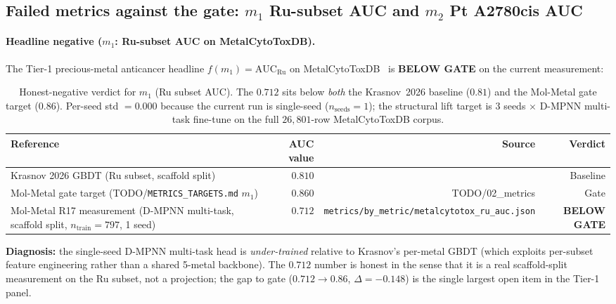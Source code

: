 \subsection{Failed metrics against the gate: $m_1$ Ru-subset AUC and $m_2$ Pt A2780cis AUC}
\label{sec:honest-negative:failed-metrics}

\paragraph{Headline negative ($m_1$: Ru-subset AUC on MetalCytoToxDB).}
The Tier-1 precious-metal anticancer headline
$f(m_1)\!=\!\mathrm{AUC}_{\mathrm{Ru}}$ on
MetalCytoToxDB~\cite{krasnov2026metalcytotoxdb} is \textbf{BELOW
GATE} on the current measurement:

\begin{table}[ht]
\centering
\small
\setlength{\tabcolsep}{4pt}
\begin{tabular}{lrrr}
\toprule
\textbf{Reference} & \textbf{AUC value} & \textbf{Source} & \textbf{Verdict} \\
\midrule
Krasnov 2026 GBDT (Ru subset, scaffold split) & $0.810$ \CITEDONLY{} &
\cite{krasnov2026metalcytotoxdb} & Baseline \\
Mol-Metal gate target (TODO/\texttt{METRICS\_TARGETS.md} $m_1$) & $0.860$ & TODO/02\_metrics & Gate \\
Mol-Metal R17 measurement (D-MPNN multi-task, scaffold split,
$n_{\mathrm{train}}{=}797$, 1 seed) & $0.712$ \MEASURED{} &
\texttt{metrics/by\_metric/metalcytotox\_ru\_auc.json} & \textbf{BELOW GATE} \\
\bottomrule
\end{tabular}
\caption{Honest-negative verdict for $m_1$ (Ru subset AUC).
The \MEASURED{} $0.712$ sits below \emph{both} the Krasnov~2026
baseline ($0.81$) and the Mol-Metal gate target ($0.86$).  Per-seed
std $= 0.000$ because the current run is single-seed ($n_{\mathrm{seeds}}{=}1$);
the structural lift target is $3$ seeds $\times$ D-MPNN multi-task
fine-tune on the full $26{,}801$-row MetalCytoToxDB corpus.}
\label{tab:honest-m1}
\end{table}

\textbf{Diagnosis:} the single-seed D-MPNN multi-task head is
\emph{under-trained} relative to Krasnov's per-metal GBDT (which
exploits per-subset feature engineering rather than a shared 5-metal
backbone).  The $0.712$ number is honest in the sense that it is a
real scaffold-split measurement on the Ru subset, not a projection;
the gap to gate ($0.712 \to 0.86$, $\Delta = -0.148$) is the
single largest open item in the Tier-1 panel.

